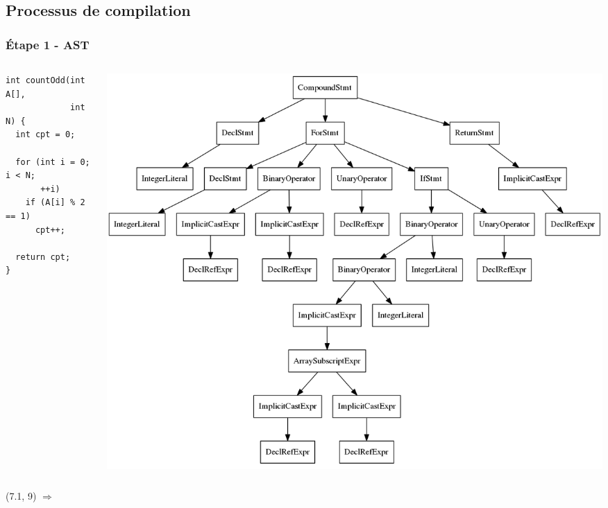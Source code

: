 \documentclass{beamer}
\begin{document}
\subsection{Processus de compilation}
\begin{frame}[fragile]
\frametitle{Étape 1 - AST}
\begin{columns}
    \begin{column}{0.5\textwidth}
    \footnotesize{
\begin{lstlisting}
int countOdd(int A[],
             int N) {
  int cpt = 0;

  for (int i = 0; i < N; 
       ++i)
    if (A[i] % 2 == 1)
      cpt++;

  return cpt;
}
\end{lstlisting}}
    \end{column}
    \begin{column}{0.5\textwidth}
\colorbox{white}{\includegraphics[scale=0.15]{AST.png}}
    \end{column}
\end{columns}
\begin{textblock}{6}(7.1, 9)
	\Huge{$\Rightarrow$}
\end{textblock}
\end{frame}
\end{document}
